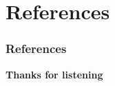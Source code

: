\documentclass[10pt]{beamer}
\begin{document}
\nocite{karoubi2008k}
\nocite{quillenhigherktheoryI}
\nocite{quillen1967homotopical}
\nocite{Goerss_Jardine_2009}	
\section{References}
\begin{frame}[allowframebreaks]
        \frametitle{References}
        
        
    \tiny{}
\end{frame}
\begin{frame}
    \textbf{\Huge{Thanks for listening}}
\end{frame}
\end{document}
